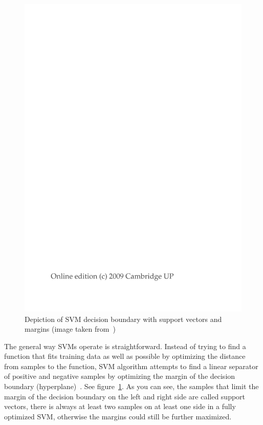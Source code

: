 \begin{figure}[htbp]
    \centering
        \includegraphics[page=3,trim=5.5cm 16cm 4cm 6.5cm,clip,width=\textwidth]{./images/external/intro-ir-svm.pdf}
    \caption{Depiction of SVM decision boundary with support vectors and margins (image taken from~\cite{manning2008introduction})}
    \label{fig:background.svm.decision.intro}
\end{figure}

The general way SVMs operate is straightforward. Instead of trying to find a function that fits training data as well as possible by optimizing the distance from samples to the function, SVM algorithm attempts to find a linear separator of positive and negative samples by optimizing the margin of the decision boundary (hyperplane)~\cite{manning2008introduction}. See figure~\ref{fig:background.svm.decision.intro}. As you can see, the samples that limit the margin of the decision boundary on the left and right side are called support vectors, there is always at least two samples on at least one side in a fully optimized SVM, otherwise the margins could still be further maximized.

